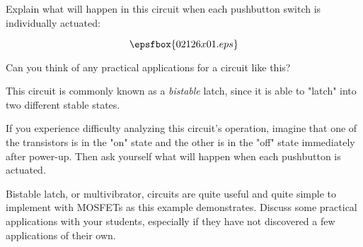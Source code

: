 

Explain what will happen in this circuit when each pushbutton switch is individually actuated:

$$\epsfbox{02126x01.eps}$$

Can you think of any practical applications for a circuit like this?







This circuit is commonly known as a {\it bistable} latch, since it is able to "latch" into two different stable states.

\vskip 10pt

If you experience difficulty analyzing this circuit's operation, imagine that one of the transistors is in the "on" state and the other is in the "off" state immediately after power-up.  Then ask yourself what will happen when each pushbutton is actuated.







Bistable latch, or multivibrator, circuits are quite useful and quite simple to implement with MOSFETs as this example demonstrates.  Discuss some practical applications with your students, especially if they have not discovered a few applications of their own.




